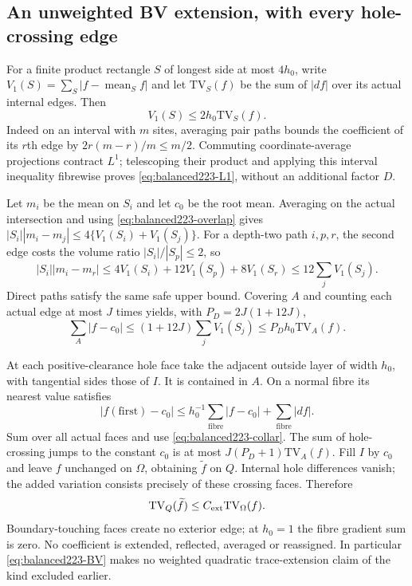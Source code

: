 \subsection{An unweighted BV extension, with every hole-crossing edge}
For a finite product rectangle $S$ of longest side at most $4h_0$, write
$V_1(S)=\sum_S|f-\operatorname{mean}_S f|$ and let $\mathrm{TV}_S(f)$
be the sum of $|df|$ over its actual internal edges. Then
\begin{equation}\label{eq:balanced223-L1}
 V_1(S)\le2h_0\mathrm{TV}_S(f).
\end{equation}
Indeed on an interval with $m$ sites, averaging pair paths bounds the
coefficient of its $r$th edge by $2r(m-r)/m\le m/2$.
Commuting coordinate-average projections contract $L^1$; telescoping their
product and applying this interval inequality fibrewise proves
\eqref{eq:balanced223-L1}, without an additional factor $D$.

Let $m_i$ be the mean on $S_i$ and let $c_0$ be the root mean.
Averaging on the actual intersection and using
\eqref{eq:balanced223-overlap} gives
$|S_i||m_i-m_j|\le4\{V_1(S_i)+V_1(S_j)\}$.
For a depth-two path $i,p,r$, the second edge costs the volume ratio
$|S_i|/|S_p|\le2$, so
\[
 |S_i||m_i-m_r|
 \le4V_1(S_i)+12V_1(S_p)+8V_1(S_r)
 \le12\sum_j V_1(S_j).
\]
Direct paths satisfy the same safe upper bound. Covering $A$ and counting
each actual edge at most $J$ times yields, with $P_D=2J(1+12J)$,
\begin{equation}\label{eq:balanced223-collar}
 \sum_A|f-c_0|\le(1+12J)\sum_jV_1(S_j)
 \le P_Dh_0\mathrm{TV}_A(f).
\end{equation}

At each positive-clearance hole face take the adjacent outside layer
of width $h_0$, with tangential sides those of $I$. It is contained in
$A$. On a normal fibre its nearest value satisfies
\[
 |f(\mathrm{first})-c_0|
 \le h_0^{-1}\sum_{\mathrm{fibre}}|f-c_0|
       +\sum_{\mathrm{fibre}}|df|.
\]
Sum over all actual faces and use \eqref{eq:balanced223-collar}.
The sum of hole-crossing jumps to the constant $c_0$ is at most
$J(P_D+1)\mathrm{TV}_A(f)$. Fill $I$ by $c_0$ and leave $f$ unchanged
on $\Omega$, obtaining $\widetilde f$ on $Q$. Internal hole differences
vanish; the added variation consists precisely of these crossing faces.
Therefore
\begin{equation}\label{eq:balanced223-BV}
 \mathrm{TV}_Q(\widetilde f)
 \le C_{\rm ext}\mathrm{TV}_\Omega(f).
\end{equation}
Boundary-touching faces create no exterior edge; at $h_0=1$ the fibre
gradient sum is zero. No coefficient is extended, reflected, averaged or
reassigned. In particular \eqref{eq:balanced223-BV} makes no weighted
quadratic trace-extension claim of the kind excluded earlier.


